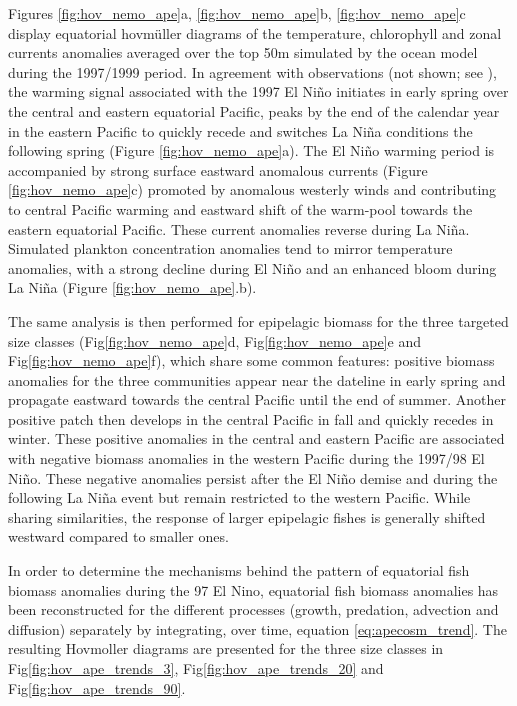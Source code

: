 Figures \ref{fig:hov_nemo_ape}a, \ref{fig:hov_nemo_ape}b, \ref{fig:hov_nemo_ape}c display equatorial hovmüller diagrams of the temperature, chlorophyll and zonal currents anomalies averaged over the top 50m simulated by the ocean model during the 1997/1999 period. In agreement with observations (not shown; see \cite{lengaigneOceanResponseMarch2002}), the warming signal associated with the 1997 El Niño initiates in early spring over the central and eastern equatorial Pacific, peaks by the end of the calendar year in the eastern Pacific to quickly recede and switches La Niña conditions the following spring (Figure \ref{fig:hov_nemo_ape}a). The El Niño warming period is accompanied by strong surface eastward anomalous currents (Figure \ref{fig:hov_nemo_ape}c) promoted by anomalous westerly winds and contributing to central Pacific warming and eastward shift of the warm-pool towards the eastern equatorial Pacific. These current anomalies reverse during La Niña. Simulated plankton concentration anomalies tend to mirror temperature anomalies, with a strong decline during El Niño and an enhanced bloom during La Niña (Figure \ref{fig:hov_nemo_ape}.b). 

The same analysis is then performed for epipelagic biomass for the three targeted size classes (Fig\ref{fig:hov_nemo_ape}d, Fig\ref{fig:hov_nemo_ape}e and Fig\ref{fig:hov_nemo_ape}f), which share some common features: positive biomass anomalies for the three communities appear near the dateline in early spring and propagate eastward towards the central Pacific until the end of summer. Another positive patch then develops in the central Pacific in fall and quickly recedes in winter. These positive anomalies in the central and eastern Pacific  are associated with negative biomass anomalies in the western Pacific during the 1997/98 El Niño. These negative anomalies persist after the El Niño demise and during the following La Niña event but remain restricted to the western Pacific. While sharing similarities, the response of larger epipelagic fishes is generally shifted westward compared to smaller ones.

In order to determine the mechanisms behind the pattern of equatorial fish biomass anomalies during the 97 El Nino, equatorial fish biomass anomalies has been reconstructed for the different processes (growth, predation, advection and diffusion) separately by integrating, over time, equation \ref{eq:apecosm_trend}. The resulting Hovmoller diagrams are presented for the three size classes in Fig\ref{fig:hov_ape_trends_3}, 
Fig\ref{fig:hov_ape_trends_20} and Fig\ref{fig:hov_ape_trends_90}.

